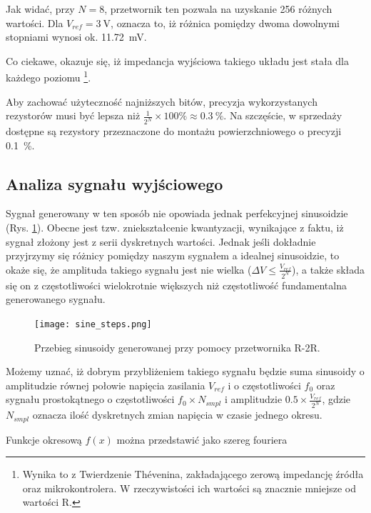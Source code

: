 \documentclass[12pt, a4paper]{article}
\begin{document}
Jak widać, przy $N=8$, przetwornik ten pozwala na uzyskanie 256 różnych wartości. Dla $V_{ref}=\qty{3}{\volt}$,
oznacza to, iż różnica pomiędzy dwoma dowolnymi stopniami wynosi ok. \qty{11,72}{\mV}.

Co ciekawe, okazuje się, iż impedancja wyjściowa takiego układu jest stała dla każdego poziomu
\footnote{
	Wynika to z Twierdzenie Thévenina, zakładającego zerową impedancję źródła oraz mikrokontrolera. 
	W rzeczywistości ich wartości są znacznie mniejsze od wartości R.
}.

Aby zachować użyteczność najniższych bitów, precyzja wykorzystanych rezystorów musi być lepsza niż
$\frac{1}{2^N} \times 100\unit{\percent} \approx \qty{0,3}{\%}$. Na szczęście,
w sprzedaży dostępne są rezystory przeznaczone do montażu powierzchniowego o precyzji \qty{0,1}{\%}.


\subsection{Analiza sygnału wyjściowego}

Sygnał generowany w ten sposób nie opowiada jednak perfekcyjnej sinusoidzie (Rys. \ref{fig:sine-stepped}).
Obecne jest tzw. zniekształcenie kwantyzacji, wynikające z faktu, iż sygnał złożony jest 
z serii dyskretnych wartości. Jednak jeśli dokładnie przyjrzymy się różnicy pomiędzy naszym sygnałem
a idealnej sinusoidzie, to okaże się, że amplituda takiego sygnału jest nie wielka 
($\Delta V \le \frac{V_{ref}}{2^N}$), a także składa się on z częstotliwości wielokrotnie większych niż
częstotliwość fundamentalna generowanego sygnału.

\begin{figure}[h]
	\centering
	\texttt{[image: sine\_steps.png]}
	\caption[short]{Przebieg sinusoidy generowanej przy pomocy przetwornika R-2R.}
	\label{fig:sine-stepped}
\end{figure}


	Możemy uznać, iż dobrym przybliżeniem takiego sygnału będzie suma sinusoidy o amplitudzie równej połowie napięcia zasilania $V_{ref}$
i o częstotliwości $f_0$ oraz sygnału prostokątnego o częstotliwości $f_0 \times N_{smpl}$ i amplitudzie $0.5 \times \frac{V_{ref}}{2^N}$, 
gdzie $N_{smpl}$ oznacza ilość dyskretnych zmian napięcia w czasie jednego okresu.


\iffalse
\begin{lemma}
		Funkcje okresową $f(x)$ można przedstawić jako szereg fouriera
\end{lemma}
\end{document}
